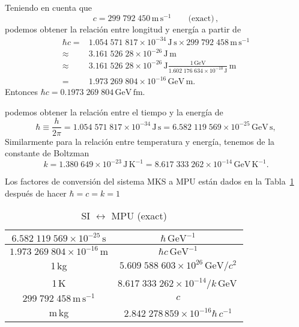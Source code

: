 \begin{frame}
Teniendo en cuenta que \cite{PDG}
\begin{equation}
    c=299\;792\;450\,\text{m}\,\text{s}^{-1}\qquad\text{(exact)}\,,
\end{equation}
podemos obtener la relación entre longitud y energía a partir de
\begin{align}
  \hbar c=&1.054\;571\;817\times10^{-34}\,\text{J}\,\text{s}\times299\;792\;458\,\text{m}\,\text{s}^{-1} \nonumber\\
  \approx&3.161\;526\;28\times10^{-26}\,\text{J}\,\text{m}\nonumber\\
  \approx&3.161\;526\;28\times10^{-26}\,{\text{J}}\frac{1\,\text{GeV}}{1.602\;176\;634\times10^{-10}\,\text{J}}\,\text{m}\nonumber\\
  =&1.973\;269\;804\times10^{-16}\,\text{GeV}\,\text{m}.
\end{align}
Entonces $\hbar c =0.1973\;269\;804\,\text{GeV}\,\text{fm}$.

podemos obtener la relación entre el tiempo y la energía de
\begin{equation}
  \hbar\equiv\frac{h}{2\pi}=1.054\;571\;817\times10^{-34}\,\text{J}\,\text{s}
  =6.582\;119\;569\times10^{-25}\,\text{GeV}\,\text{s},
\end{equation}
Similarmente para la relación entre temperatura y energía, tenemos de la constante de Boltzman
\begin{equation}
  k=1.380\;649\times10^{-23}\,\text{J}\,\text{K}^{-1}=8.617\;333\;262\times10^{-14}\,\text{GeV}\,\text{K}^{-1}.
\end{equation}


Los factores de conversión del sistema MKS a MPU están dados en la Tabla~\ref{tab:mks2mpu} despu\'es de hacer $\hbar=c=k=1$

\begin{table} %
  \centering %
  \begin{tabular}{c|c} %
$6.582\;119\;569\times10^{-25}\,\text{s}$ & $ {\hbar}\,\text{GeV}^{-1}$\\\hline
$1.973\;269\;804\times10^{-16}\,\text{m}$ & $ {\hbar c}\,\text{GeV}^{-1} $\\ \hline
1\,kg& $5.609\;588\;603\times10^{26}\,\text{GeV}/c^2$ \\ \hline
1\,K & $8.617\;333\;262\times10^{-14}/k\,\text{GeV}$\,\\ \hline
$299\;792\;458\,\text{m}\,\text{s}^{-1}$&$c$\\ \hline
m\,kg&$2.842\;278\,859\times10^{-16}\hbar\,c^{-1}$\\ \hline
  \end{tabular} %
  \caption{SI $\leftrightarrow$ MPU (exact)} %
  \label{tab:mks2mpu} %
\end{table} %



\end{frame}
